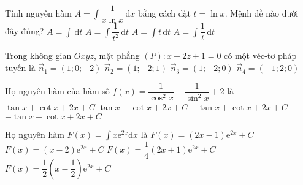 \begin{ex}%
Tính nguyên hàm $A=\displaystyle\int\limits \dfrac{1}{x\ln {x}}\mathrm{\,d}x$ bằng cách đặt $t=\ln {x}$. Mệnh đề nào dưới đây đúng?
\choice
{$A=\displaystyle\int\limits \mathrm{\,d}t$}
{$A=\displaystyle\int\limits \dfrac{1}{t^2} \mathrm{\,d}t$}
{$A=\displaystyle\int\limits t \mathrm{\,d}t$}
{\True $A=\displaystyle\int\limits \dfrac{1}{t} \mathrm{\,d}t$}
\end{ex}

\begin{ex}%
Trong không gian $O x y z$, mặt phẳng $(P): x-2 z+1=0$ có một véc-tơ pháp tuyến là
\choice
{\True $\vec{n}_{1}=(1 ; 0 ;-2)$}
{$\vec{n}_{2}=(1 ;-2 ; 1)$}
{$\vec{n}_{3}=(1 ;-2 ; 0)$}
{$\vec{n}_{4}=(-1 ; 2 ; 0)$}
\end{ex}

\begin{ex}%
Họ nguyên hàm của hàm số $f(x)=\dfrac{1}{\cos^2 x}-\dfrac{1}{\sin^2 x}+2$ là
\choice
{\True $\tan x+\cot x+2x+C$}
{$\tan x-\cot x+2x+C$}
{$-\tan x+\cot x+2x+C$}
{$-\tan x-\cot x+2x+C$}
\end{ex}

\begin{ex}%
Họ nguyên hàm $F(x)=\displaystyle\int x\mathrm{e}^{2x}\mathrm{d}x$ là
\choice
{$F(x)=(2x-1)\mathrm{e}^{2x}+C$}
{$F(x)=(x-2)\mathrm{e}^{2x}+C$}
{$F(x)=\dfrac{1}{4}(2x+1)\mathrm{e}^{2x}+C$}
{\True $F(x)=\dfrac{1}{2}\left(x-\dfrac{1}{2}\right)\mathrm{e}^{2x}+C$}
\end{ex}

